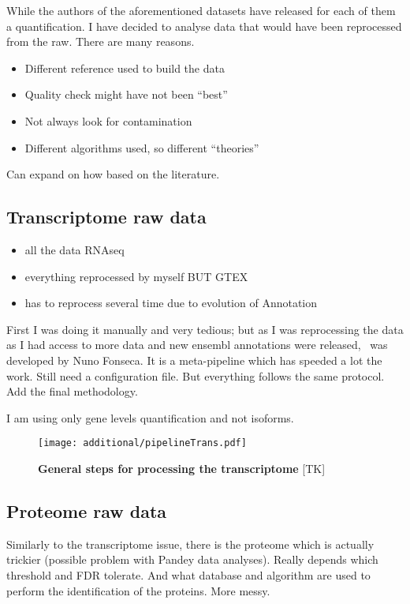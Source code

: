 While the authors of the aforementioned datasets have released for each of them
a quantification. I have decided to analyse data that would have been reprocessed
from the raw. There are many reasons.
\begin{itemize}
    \item Different reference used to build the data
    \item Quality check might have not been ``best''
    \item Not always look for contamination
    \item Different algorithms used, so different ``theories''
\end{itemize}


Can expand on how based on the literature.


\subsection{Transcriptome raw data}

\begin{itemize}
        \item all the data RNAseq
        \item everything reprocessed by myself BUT GTEX
        \item has to reprocess several time due to evolution of Annotation
\end{itemize}

First I  was doing it manually and very tedious; but as I was reprocessing the data
as I had access to more data and new ensembl annotations were released, \irap\
was developed by Nuno Fonseca. It is a meta-pipeline which has speeded a lot the
work. Still need a configuration file. But everything follows the same protocol.
Add the final methodology.

I am using only gene levels quantification and not isoforms.

\begin{figure}
    \texttt{[image: additional/pipelineTrans.pdf]}\centering
    \caption[General steps for processing the transcriptomic
    data]{\label{fig:pipelineTrans}\textbf{General steps for processing the
    transcriptome} [TK]}
  \end{figure}


\subsection{Proteome raw data}

Similarly to the transcriptome issue, there is the proteome which is actually
trickier (possible problem with Pandey data analyses). Really depends which
threshold and \gls{FDR} tolerate. And what database and algorithm are used to perform
the identification of the proteins. More messy.


